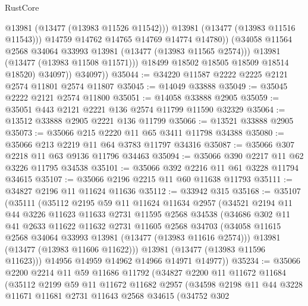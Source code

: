 \begin{lexlean}{RustCore}
\begin{coremodule}
                        @13981
                        (@13477 (@13983 @11526 @11542)))
                      @13981
                      (@13477 (@13983 @11516 @11543)))
                    @14759
                    @14762
                    @14765
                    @14769
                    @14774
                    @14780))
                (@34058 @11564 @2568 @34064 @33993 @13981 (@13477 (@13983 @11565 @2574)))
                @13981
                (@13477 (@13983 @11508 @11571)))
              @18499
              @18502
              @18505
              @18509
              @18514
              @18520)
            @34097))
        @34097))
@35044 := @34220 @11587 @2222 @2225 @2121 @2574 @11801 @2574 @11807
@35045 := @14049 @33888
@35049 := @35045 @2222 @2121 @2574 @11800
@35051 := @14058 @33888 @2905
@35059 := @35051 @443 @2121 @2221 @136 @2574 @11799 @11590 @32329
@35064 := @13512 @33888 @2905 @2221 @136 @11799
@35066 := @13521 @33888 @2905
@35073 := @35066 @215 @2220 @11 @65 @3411 @11798 @34388
@35080 := @35066 @213 @2219 @11 @64 @3783 @11797 @34316
@35087 := @35066 @307 @2218 @11 @63 @9136 @11796 @34463
@35094 := @35066 @390 @2217 @11 @62 @3226 @11795 @34538
@35101 := @35066 @392 @2216 @11 @61 @3228 @11794 @34615
@35107 := @35066 @2196 @2215 @11 @60 @11638 @11793
@35111 := @34827 @2196 @11 @11624 @11636
@35112 := @33942 @315
@35168 := @35107
    (@35111
      (@35112
        @2195
        @59
        @11
        @11624
        @11634
        @2957
        (@34521
          @2194
          @11
          @44
          @3226
          @11623
          @11633
          @2731
          @11595
          @2568
          @34538
          (@34686
            @302
            @11
            @41
            @2633
            @11622
            @11632
            @2731
            @11605
            @2568
            @34703
            (@34058 @11615 @2568 @34064 @33993 @13981 (@13477 (@13983 @11616 @2574)))
            @13981
            (@13477 (@13983 @11606 @11622)))
          @13981
          (@13477 (@13983 @11596 @11623)))
        @14956
        @14959
        @14962
        @14966
        @14971
        @14977))
@35234 := @35066
    @2200
    @2214
    @11
    @59
    @11686
    @11792
    (@34827
      @2200
      @11
      @11672
      @11684
      (@35112
        @2199
        @59
        @11
        @11672
        @11682
        @2957
        (@34598
          @2198
          @11
          @44
          @3228
          @11671
          @11681
          @2731
          @11643
          @2568
          @34615
          (@34752
            @302

\end{coremodule}
\end{lexlean}
